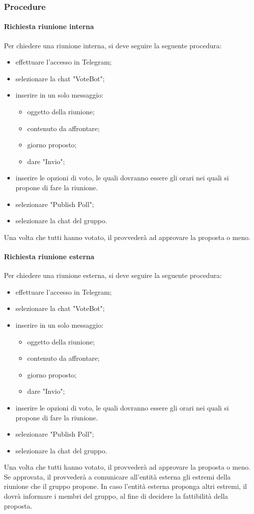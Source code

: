  \subsubsection{Procedure}
 \paragraph{Richiesta riunione interna}
 Per chiedere una riunione interna, si deve seguire la seguente procedura:
 \begin{itemize}
 	\item effettuare l'accesso in Telegram;
 	\item selezionare la chat "VoteBot";
 	\item inserire in un solo messaggio:
 	\begin{itemize}
 		\item oggetto della riunione;
 		\item contenuto da affrontare;
	 	\item giorno proposto;
	 	\item dare "Invio";
 	\end{itemize}
 	\item inserire le opzioni di voto, le quali dovranno essere gli orari nei quali si propone di fare la riunione.
 	\item selezionare "Publish Poll";
 	\item selezionare la chat del gruppo.
 \end{itemize}
 Una volta che tutti hanno votato, il \RESP{} provvederà ad approvare la proposta o meno.
 \paragraph{Richiesta riunione esterna}
 Per chiedere una riunione esterna, si deve seguire la seguente procedura:
 \begin{itemize}
 	\item effettuare l'accesso in Telegram;
 	\item selezionare la chat "VoteBot";
 	\item inserire in un solo messaggio:
 	\begin{itemize}
 		\item oggetto della riunione;
 		\item contenuto da affrontare;
 		\item giorno proposto;
 		\item dare "Invio";
 	\end{itemize}
 	\item inserire le opzioni di voto, le quali dovranno essere gli orari nei quali si propone di fare la riunione.
 	\item selezionare "Publish Poll";
 	\item selezionare la chat del gruppo.
 \end{itemize}
 Una volta che tutti hanno votato, il \RESP{} provvederà ad approvare la proposta o meno. \\
 Se approvata, il \RESP{} provvederà a comunicare all'entità esterna gli estremi della riunione che il gruppo propone. In caso l'entità esterna proponga altri estremi, il \RESP{} dovrà informare i membri del gruppo, al fine di decidere la fattibilità della proposta. 
